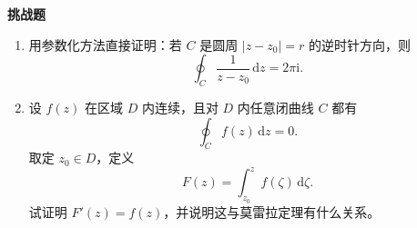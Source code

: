 \textbf{挑战题}

\begin{enumerate}[resume]
    \item 用参数化方法直接证明：若 $C$ 是圆周 $|z-z_0|=r$ 的逆时针方向，则
    \[
        \oint_C \frac{1}{z-z_0}\,\mathrm{d}z = 2\pi\mathrm{i}.
    \]
    
    \item 设 $f(z)$ 在区域 $D$ 内连续，且对 $D$ 内任意闭曲线 $C$ 都有
    \[
        \oint_C f(z)\,\mathrm{d}z = 0.
    \]
    取定 $z_0\in D$，定义
    \[
        F(z)=\int_{z_0}^{z} f(\zeta)\,\mathrm{d}\zeta.
    \]
    试证明 $F'(z)=f(z)$，并说明这与莫雷拉定理有什么关系。
\end{enumerate}
